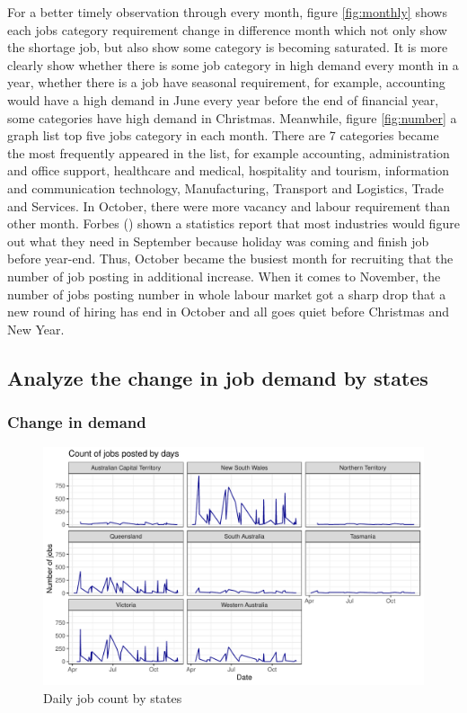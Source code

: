 \documentclass[11pt,a4paper,]{article}
\begin{document}
For a better timely observation through every month, figure \ref{fig:monthly} shows each jobs category requirement change in difference month which not only show the shortage job, but also show some category is becoming saturated. It is more clearly show whether there is some job category in high demand every month in a year, whether there is a job have seasonal requirement, for example, accounting would have a high demand in June every year before the end of financial year, some categories have high demand in Christmas. Meanwhile, figure \ref{fig:number} a graph list top five jobs category in each month. There are 7 categories became the most frequently appeared in the list, for example accounting, administration and office support, healthcare and medical, hospitality and tourism, information and communication technology, Manufacturing, Transport and Logistics, Trade and Services. In October, there were more vacancy and labour requirement than other month. Forbes (\textcite{Forbes_2019}) shown a statistics report that most industries would figure out what they need in September because holiday was coming and finish job before year-end. Thus, October became the busiest month for recruiting that the number of job posting in additional increase. When it comes to November, the number of jobs posting number in whole labour market got a sharp drop that a new round of hiring has end in October and all goes quiet before Christmas and New Year.

\hypertarget{analyze-the-change-in-job-demand-by-states}{%
\subsection{Analyze the change in job demand by states}\label{analyze-the-change-in-job-demand-by-states}}

\hypertarget{change-in-demand}{%
\subsubsection{Change in demand}\label{change-in-demand}}

\begin{figure}

{\centering \includegraphics{Team_JHDP_Assignment4_files/figure-latex/state-demand-1} 

}

\caption{Daily job count by states}\label{fig:state-demand}
\end{figure}
\end{document}
